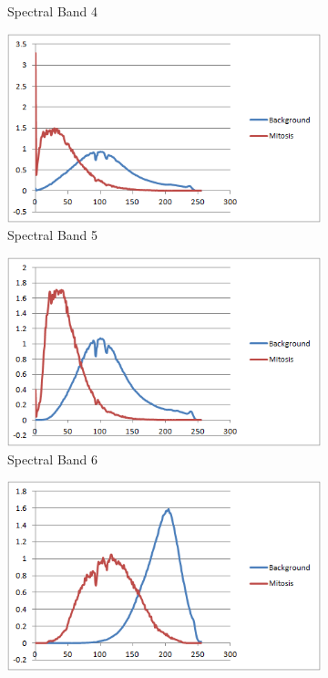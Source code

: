 \documentclass[10pt,twocolumn,letterpaper]{article}
\begin{document}
\begin{figure}[b]
\begin{subfigure}[b]{0.22\textwidth}
		\caption*{Spectral Band 4}
	\end{subfigure}
	\begin{subfigure}[b]{0.22\textwidth}
		\includegraphics[width=\textwidth]{diagrams/Band5.png}
		\caption*{Spectral Band 5}
	\end{subfigure}
	\begin{subfigure}[b]{0.22\textwidth}
		\includegraphics[width=\textwidth]{diagrams/Band6.png}
		\caption*{Spectral Band 6}
	\end{subfigure}
	\begin{subfigure}[b]{0.22\textwidth}
		\includegraphics[width=\textwidth]{diagrams/Band7.png}

\end{subfigure}
\end{figure}
\end{document}
